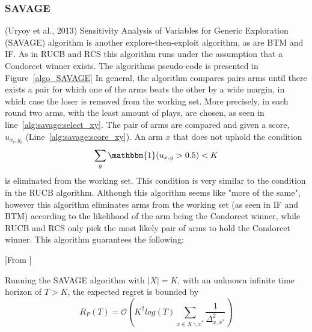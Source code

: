 \documentclass{llncs}
\begin{document}
\subsubsection{SAVAGE}
	(Uryoy et al., 2013) Sensitivity Analysis of Variables for Generic Exploration (SAVAGE) algorithm is another explore-then-exploit algorithm, as are BTM and IF.
	As in RUCB and RCS this algorithm runs under the assumption that a Condorcet winner exists.
	The algorithms pseudo-code is presented in Figure~\ref{algo_SAVAGE}
	In general, the algorithm compares  pairs arms until there exists a pair for which one of the arms beats the other by a wide margin, in which case the loser is removed from the working set.
	More precisely, in each round two arms, with the least amount of plays, are chosen, as seen in line~\ref{alg:savage:select_xy}.
	The pair of arms are compared and given a score, $u_{x_t, y_t}$ (Line~\ref{alg:savage:score_xy}).
	An arm $x$ that does not uphold the condition
	$$ \sum_{y}\mathbbm{1}(u_{x,y} > 0.5) < K $$
	is eliminated from the working set.
	This condition is very similar to the condition in the RUCB algorithm.
	Although this algorithm seems like "more of the same", however this algorithm eliminates arms from the working set (as seen in IF and BTM) according to the likelihood of the arm being the Condorcet winner, while RUCB and RCS only pick the most likely pair of arms to hold the Condorcet winner.
	This algorithm guarantees the following:
	\begin{theorem}\label{thm:SAVAGE}[From \cite{...}]

		Running the SAVAGE algorithm with $|X|=K$, with an unknown infinite time horizon of $T>K$, the expected regret is bounded by $$R_P(T) = \mathcal{O} \left( K^2 log( T ) \sum\limits_{x\in X \backslash x^*} \frac{1}{\Delta_{x,x^*}^2}\right)$$

	\end{theorem}
	
\end{document}
